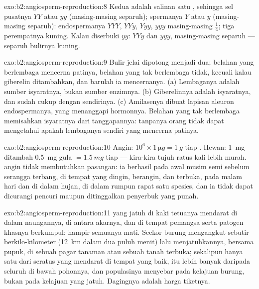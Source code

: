 \begin{solution}{exo:b2:angiosperm-reproduction:8}
Kedua  adalah salinan satu , sehingga sel
pusatnya $YY$ atau $yy$ (masing-masing separuh); spermanya $Y$ atau $y$
(masing-masing separuh): endospermanya $YYY$, $YYy$, $Yyy$, $yyy$
masing-masing $\tfrac14$; tiga perempatnya kuning. Kalau diserbuki
$yy$: $YYy$ dan $yyy$, masing-masing separuh --- separuh bulirnya
kuning.
\end{solution}

\begin{solution}{exo:b2:angiosperm-reproduction:9}
Bulir jelai dipotong menjadi dua; belahan yang berlembaga mencerna
patinya, belahan yang tak berlembaga tidak, kecuali kalau giberelin
ditambahkan, dan barulah ia mencernanya. (a) Lembaganya adalah sumber
isyaratnya, bukan sumber enzimnya. (b) Giberelinnya adalah isyaratnya,
dan sudah cukup dengan sendirinya. (c) Amilasenya dibuat lapisan
aleuron endospermanya, yang menanggapi hormonnya. Belahan yang tak
berlembaga memisahkan isyaratnya dari tanggapannya: tanpanya orang
tidak dapat mengetahui apakah lembaganya sendiri yang mencerna patinya.
\end{solution}

\begin{solution}{exo:b2:angiosperm-reproduction:10}
Angin: $10^{6}\times\qty{1}{\micro g} = \qty{1}{g}$ tiap .
Hewan: \qty{1}{mg}  ditambah \qty{0.5}{mg} gula
$= \qty{1.5}{mg}$ tiap  --- kira-kira tujuh ratus kali lebih
murah.  angin tidak membutuhkan pasangan: ia berhasil pada
awal musim semi sebelum serangga terbang, di tempat yang dingin,
berangin, dan terbuka, pada malam hari dan di dalam hujan, di dalam
rumpun rapat satu spesies, dan ia tidak dapat dicurangi pencuri 
maupun ditinggalkan penyerbuk yang punah.
\end{solution}

\begin{solution}{exo:b2:angiosperm-reproduction:11}
 yang jatuh di kaki tetuanya mendarat di dalam naungannya, di
antara akarnya, dan di tempat pemangsa  serta patogen khasnya
berkumpul; hampir semuanya mati. Seekor burung mengangkut sebutir 
berkilo-kilometer (\qty{12}{km} dalam dua puluh menit) lalu
menjatuhkannya, bersama pupuk, di sebuah pagar tanaman atau sebuah
tanah terbuka; sekalipun hanya satu  dari seratus yang mendarat di
tempat yang baik, itu lebih banyak daripada seluruh  di bawah
pohonnya, dan populasinya menyebar pada kelajuan burung, bukan pada
kelajuan  yang jatuh. Dagingnya adalah harga tiketnya.
\end{solution}

